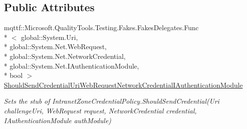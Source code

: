 \subsection*{Public Attributes}
\begin{DoxyCompactItemize}
\item 
mqttf\-::\-Microsoft.\-Quality\-Tools.\-Testing.\-Fakes.\-Fakes\-Delegates.\-Func\\*
$<$ global\-::\-System.\-Uri, \\*
global\-::\-System.\-Net.\-Web\-Request, \\*
global\-::\-System.\-Net.\-Network\-Credential, \\*
global\-::\-System.\-Net.\-I\-Authentication\-Module, \\*
bool $>$ \hyperlink{class_microsoft_1_1_win32_1_1_fakes_1_1_stub_intranet_zone_credential_policy_ab0e54738c8e9482afae00e7cf8c4b731}{Should\-Send\-Credential\-Uri\-Web\-Request\-Network\-Credential\-I\-Authentication\-Module}
\begin{DoxyCompactList}\small\item\em Sets the stub of Intranet\-Zone\-Credential\-Policy.\-Should\-Send\-Credential(\-Uri challenge\-Uri, Web\-Request request, Network\-Credential credential, I\-Authentication\-Module auth\-Module)\end{DoxyCompactList}\end{DoxyCompactItemize}
